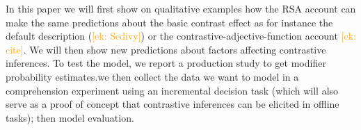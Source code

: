 \documentclass[10pt,letterpaper]{article}
\newcommand{\ek}[1]{\textcolor{Orange}{[ek: #1]}}
\newcommand{\jd}[1]{\textcolor{Purple}{[jd: #1]}}
\begin{document}
In this paper we will first show on qualitative examples how the RSA account can make the same predictions about the basic contrast effect as for instance the default description (\ek{Sedivy}) or the contrastive-adjective-function account \ek{cite}. We will then show new predictions about factors affecting contrastive inferences. To test the model, we report a production study to get modifier probability estimates.we then collect the data we want to model in a comprehension experiment using an incremental decision task (which will also serve as a proof of concept that contrastive inferences can be elicited in offline tasks); then model evaluation.





\end{document}

